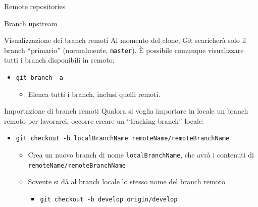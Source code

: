 \documentclass[presentation]{beamer}
\begin{document}
\begin{frame}{Remote repositories}
\begin{block}{Branch upstream}
	\end{block}
	\begin{block}{Visualizzazione dei branch remoti}
		Al momento del clone, Git scaricherà solo il branch ``primario'' (normalmente, \texttt{master}). È possibile comunque visualizzare tutti i branch disponibili in remoto:
		\begin{itemize}
			\item \texttt{git branch -a}
			\begin{itemize}
				\item Elenca tutti i branch, inclusi quelli remoti.
			\end{itemize}
		\end{itemize}
	\end{block}
	\begin{block}{Importazione di branch remoti}
		Qualora si voglia importare in locale un branch remoto per lavorarci, occorre creare un ``tracking branch'' locale:
		\begin{itemize}
			\item \texttt{git checkout -b localBranchName remoteName/remoteBranchName}
			\begin{itemize}
				\item Crea un nuovo branch di nome \texttt{localBranchName}, che avrà i contenuti di \texttt{remoteName/remoteBranchName}
				\item Sovente si dà al branch locale lo stesso nome del branch remoto
				\begin{itemize}
					\item \texttt{git checkout -b develop origin/develop}
				\end{itemize}
			\end{itemize}
		\end{itemize}
	\end{block}
\end{frame}
\end{document}
